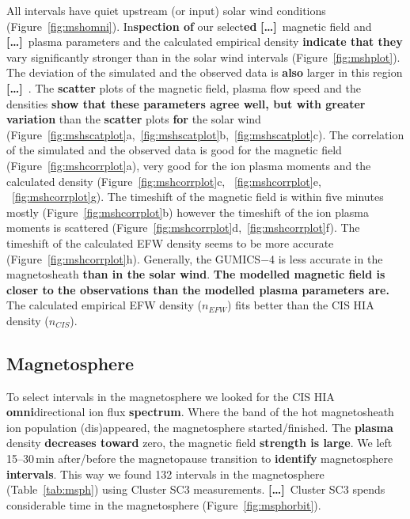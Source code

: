 \documentclass[linenumbers,draft]{agujournal}
\newcommand{\del}{\textbf{[\dots]}\ } %
\begin{document}
All intervals have quiet upstream (or input) solar wind conditions (Figure~\ref{fig:mshomni}). In\textbf{spection of} our select\textbf{ed} \del magnetic field and \del plasma parameters and the calculated empirical density \textbf{indicate that they} vary significantly stronger than in the solar wind intervals (Figure~\ref{fig:mshplot}). The deviation of the simulated and the observed data is \textbf{also} larger in this region \del. The \textbf{scatter} plots of the magnetic field, plasma flow speed and the densities \textbf{show that these parameters agree well, but with greater variation} than the \textbf{scatter} plots \textbf{for} the solar wind (Figure~\ref{fig:mshscatplot}a,~\ref{fig:mshscatplot}b,~\ref{fig:mshscatplot}c). The correlation of the simulated and the observed data is good for the magnetic field (Figure~\ref{fig:mshcorrplot}a), very good for the ion plasma moments and the calculated density (Figure~\ref{fig:mshcorrplot}c, ~\ref{fig:mshcorrplot}e, ~\ref{fig:mshcorrplot}g). The timeshift of the magnetic field is within five minutes mostly (Figure~\ref{fig:mshcorrplot}b) however the timeshift of the ion plasma moments is scattered (Figure~\ref{fig:mshcorrplot}d,~\ref{fig:mshcorrplot}f). The timeshift of the calculated EFW density seems to be more accurate (Figure~\ref{fig:mshcorrplot}h). Generally, the GUMICS$-$4 is less accurate in the magnetosheath \textbf{than in the solar wind}. \textbf{The modelled magnetic field is closer to the observations than the modelled plasma parameters are.} The calculated empirical EFW density ($n_{EFW}$) fits better than the CIS HIA density ($n_{CIS}$).

\subsection{Magnetosphere}
\label{sec:msph}

To select intervals in the magnetosphere we looked for the CIS HIA \textbf{omni}directional ion flux \textbf{spectrum}. Where the band of the hot magnetosheath ion population (dis)appeared, the magnetosphere started/finished. The \textbf{plasma} density \textbf{decreases toward} zero, the magnetic field \textbf{strength is large}. We left 15--30\,min after/before the magnetopause transition to \textbf{identify} magnetosphere \textbf{intervals}. This way we found 132 intervals in the magnetosphere (Table~\ref{tab:msph}) using Cluster SC3 measurements. \del Cluster SC3 spends considerable time in the magnetosphere (Figure~\ref{fig:msphorbit}). 
\end{document}
